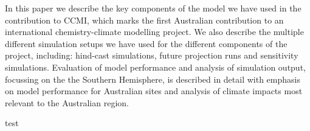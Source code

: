 In this paper we describe the key components of the model we have used in the contribution to CCMI, which marks the first Australian contribution to an international chemistry-climate modelling project. We also describe the multiple different simulation setups we have used for the different components of the project, including: hind-cast simulations, future projection runs and sensitivity simulations. Evaluation of model performance and analysis of simulation output, focussing on the the Southern Hemisphere, is described in detail with emphasis on model performance for Australian sites and analysis of climate impacts most relevant to the Australian region.

test